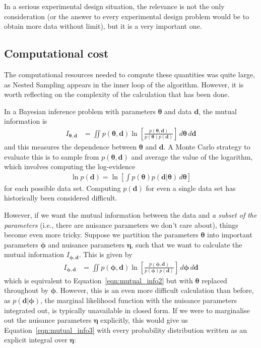 \documentclass[entropy,article,accept,oneauthor,pdftex,10pt,a4paper]{mdpi}
\renewcommand{\d}{\boldsymbol{d}}
\newcommand{\x}{\boldsymbol{\theta}}
\newcommand{\bphi}{\boldsymbol{\phi}}
\newcommand{\boldeta}{\boldsymbol{\eta}}
\begin{document}
In a serious experimental design situation, the relevance is not the only
consideration (or the answer to every experimental design problem would
be to obtain more data without limit), but it is a very important one.

\subsection{Computational cost}

The computational resources needed to compute these quantities was quite large,
as Nested Sampling appears in the inner loop of the algorithm.
However, it is worth reflecting on the complexity of the calculation that
has been done.

In a Bayesian inference problem with parameters $\x$ and data $\d$, the
mutual information is
\begin{align}
I_{\x, \d} &= \iint p(\x, \d)
                        \ln \left[\frac{p(\x, \d)}{p(\x)p(\d)}\right]
                        \, d\x \, d\d \label{eqn:mutual_info2}
\end{align}
and this measures the dependence between $\x$ and $\d$. A
Monte Carlo
strategy to evaluate this is to sample from $p(\x, \d)$ and average
the value of the logarithm, which involves computing the log-evidence
\begin{align}
\ln p(\d) = \ln\left[\int p(\x)p(\d | \x) \, d\x\right]
\end{align}
for each possible data set.
Computing $p(\d)$ for even a single
data set has historically been considered difficult.

However, if we want the mutual information between the data and
{\em a subset of the parameters} (i.e., there are nuisance parameters
we don't care about), things become even more tricky. Suppose we
partition the parameters $\x$ into important parameters
$\bphi$ and nuisance parameters $\boldeta$, such that we want to calculate
the mutual information $I_{\bphi, \d}$. This is given by
\begin{align}
I_{\bphi, \d} &= \iint p(\bphi, \d)
                        \ln \left[\frac{p(\bphi, \d)}{p(\bphi)p(\d)}\right]
                        \, d\bphi \, d\d \label{eqn:mutual_info3}
\end{align}
which is equivalent to Equation~\ref{eqn:mutual_info2} but with
$\x$ replaced throughout by $\bphi$. However, this is an even more
difficult calculation than before, as $p(\d | \bphi)$, the marginal likelihood
function with the nuisance parameters integrated out, is typically
unavailable in closed form. If we were to marginalise out the nuisance
parameters $\boldeta$ explicitly, this would give us
Equation~\ref{eqn:mutual_info3} with every probability distribution
written as an explicit integral over $\boldeta$:
\end{document}
